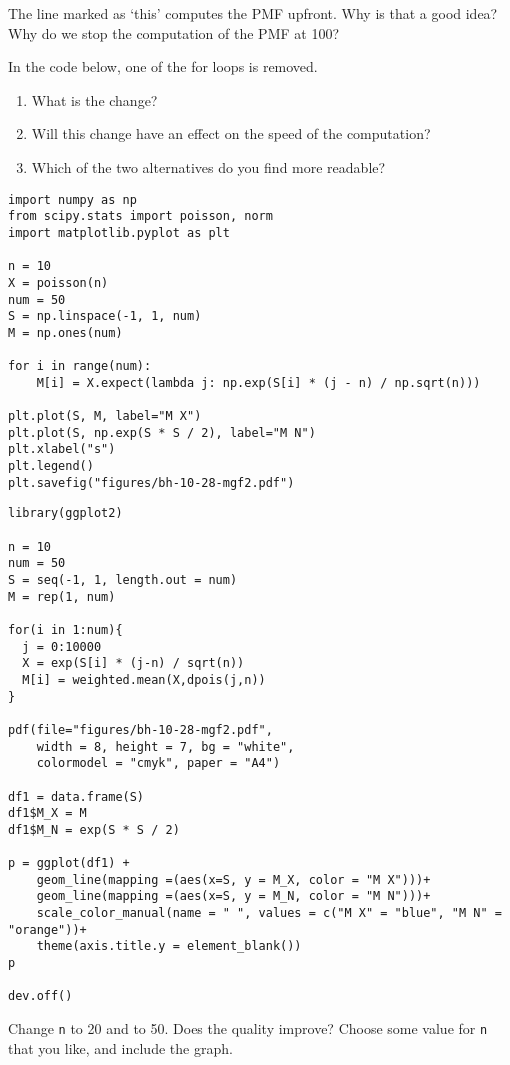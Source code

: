 \begin{exercise}
The line marked as `this' computes the PMF upfront. Why is that a good idea?
Why do we stop the computation of the PMF at 100?
\end{exercise}


\begin{exercise}
In the code below, one of the for loops is removed.
\begin{enumerate}
\item What is the change?
\item Will this change have an effect on the speed of the computation?
\item Which of the two alternatives do you find more readable?
\end{enumerate}
\end{exercise}


\begin{verbatim}
import numpy as np
from scipy.stats import poisson, norm
import matplotlib.pyplot as plt

n = 10
X = poisson(n)
num = 50
S = np.linspace(-1, 1, num)
M = np.ones(num)

for i in range(num):
    M[i] = X.expect(lambda j: np.exp(S[i] * (j - n) / np.sqrt(n)))

plt.plot(S, M, label="M X")
plt.plot(S, np.exp(S * S / 2), label="M N")
plt.xlabel("s")
plt.legend()
plt.savefig("figures/bh-10-28-mgf2.pdf")
\end{verbatim}

\begin{verbatim}
library(ggplot2)

n = 10
num = 50
S = seq(-1, 1, length.out = num)
M = rep(1, num)

for(i in 1:num){
  j = 0:10000
  X = exp(S[i] * (j-n) / sqrt(n))
  M[i] = weighted.mean(X,dpois(j,n))
}

pdf(file="figures/bh-10-28-mgf2.pdf",
    width = 8, height = 7, bg = "white",
    colormodel = "cmyk", paper = "A4")

df1 = data.frame(S)
df1$M_X = M
df1$M_N = exp(S * S / 2)

p = ggplot(df1) +
    geom_line(mapping =(aes(x=S, y = M_X, color = "M X")))+
    geom_line(mapping =(aes(x=S, y = M_N, color = "M N")))+
    scale_color_manual(name = " ", values = c("M X" = "blue", "M N" = "orange"))+
    theme(axis.title.y = element_blank())
p

dev.off()
\end{verbatim}

\begin{exercise}
Change \texttt{n} to 20 and to 50. Does the quality improve? Choose some value for \texttt{n} that you like, and include the graph.
\end{exercise}



